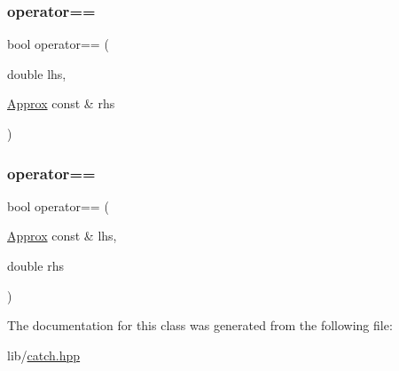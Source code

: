 \subsubsection{\texorpdfstring{operator==}{operator==}\hspace{0.1cm}{\footnotesize\ttfamily [1/2]}}
{\footnotesize\ttfamily bool operator== (\begin{DoxyParamCaption}\item[{double}]{lhs,  }\item[{\hyperlink{class_catch_1_1_detail_1_1_approx}{Approx} const \&}]{rhs }\end{DoxyParamCaption})\hspace{0.3cm}{\ttfamily [friend]}}

\hypertarget{class_catch_1_1_detail_1_1_approx_a35999631e6cef569f9da9f3fa910db22}{}\label{class_catch_1_1_detail_1_1_approx_a35999631e6cef569f9da9f3fa910db22} 
\subsubsection{\texorpdfstring{operator==}{operator==}\hspace{0.1cm}{\footnotesize\ttfamily [2/2]}}
{\footnotesize\ttfamily bool operator== (\begin{DoxyParamCaption}\item[{\hyperlink{class_catch_1_1_detail_1_1_approx}{Approx} const \&}]{lhs,  }\item[{double}]{rhs }\end{DoxyParamCaption})\hspace{0.3cm}{\ttfamily [friend]}}



The documentation for this class was generated from the following file\+:\begin{DoxyCompactItemize}
\item 
lib/\hyperlink{catch_8hpp}{catch.\+hpp}\end{DoxyCompactItemize}
